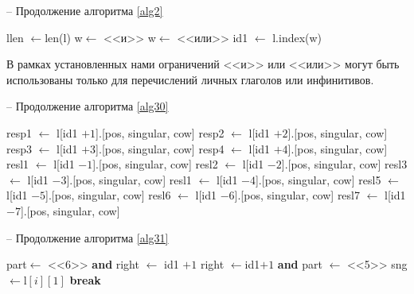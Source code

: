 \documentclass[main]{subfiles}
\begin{document}
\begin{algorithm}[!h]
	\caption{-- Продолжение алгоритма \ref{alg2}}\label{alg30}
	\begin{algorithmic}[1]
		\State llen $\gets $len(l) 
		\State w$\gets$ <<и>>
		\State w$\gets$ <<или>>
		\EndIf
		\State id1 $\gets$ l.index(w) 
	\end{algorithmic}
\end{algorithm}
В рамках установленных нами ограничений <<и>> или <<или>> могут быть использованы только для перечислений личных глаголов или инфинитивов.

\begin{algorithm}[!h]
	\caption{-- Продолжение алгоритма \ref{alg30}}\label{alg31}
	\begin{algorithmic}[1]
		\State resp1 $\gets$ l[id1 $+ 1$].[pos, singular, cow] 
			\EndIf
		\State resp2 $\gets$ l[id1 $+ 2$].[pos, singular, cow]
		\EndIf	
		\State resp3 $\gets$ l[id1 $+ 3$].[pos, singular, cow] 
		\EndIf
		\State resp4 $\gets$ l[id1 $+ 4$].[pos, singular, cow]
		\EndIf
		\State resl1 $\gets$ l[id1 $-1$].[pos, singular, cow]
		\EndIf
		\State resl2 $\gets$ l[id1 $-2$].[pos, singular, cow]
		\EndIf
		\State resl3 $\gets$ l[id1 $-3$].[pos, singular, cow]
		\EndIf
		\State resl1 $\gets$ l[id1 $-4$].[pos, singular, cow]
		\EndIf
		\State resl5 $\gets$ l[id1 $-5$].[pos, singular, cow]
		\EndIf
		\State resl6 $\gets$ l[id1 $-6$].[pos, singular, cow]
		\EndIf
		\State resl7 $\gets$ l[id1 $-7$].[pos, singular, cow]
		\EndIf
	\end{algorithmic}
\end{algorithm}

\begin{algorithm}[!h]
	\caption{-- Продолжение алгоритма \ref{alg31}}\label{alg3}
	\begin{algorithmic}[1]
		 
		\State part$\gets$ <<6>> \textbf{and} right $\gets$ id1 $+1$
		\EndIf
		\EndFor
		\State right $\gets$id1$ + 1$ \textbf{and}  part $\gets$ <<5>>
		\State sng $\gets $l$[i][1]$ 
		\State \textbf{break}
		\EndIf
		\EndFor
		\EndIf
		\EndIf
	\end{algorithmic}
\end{algorithm}
\end{document}
